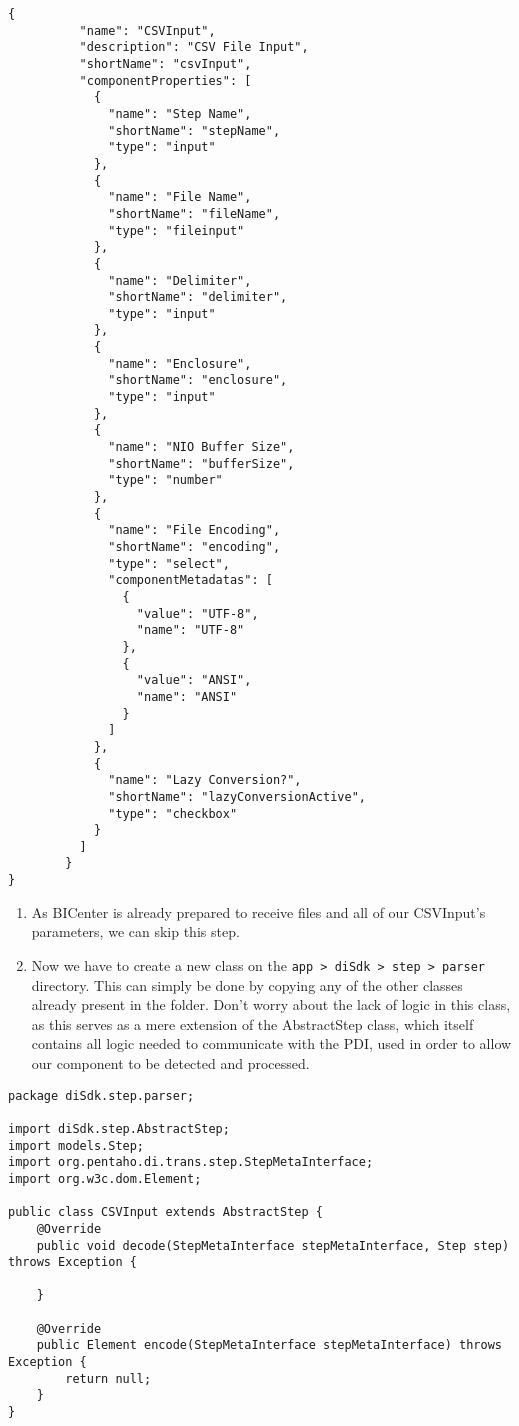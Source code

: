 \documentclass[
  11pt,
]{krantz}
\begin{document}
\begin{verbatim}
{
          "name": "CSVInput",
          "description": "CSV File Input",
          "shortName": "csvInput",
          "componentProperties": [
            {
              "name": "Step Name",
              "shortName": "stepName",
              "type": "input"
            },
            {
              "name": "File Name",
              "shortName": "fileName",
              "type": "fileinput"
            },
            {
              "name": "Delimiter",
              "shortName": "delimiter",
              "type": "input"
            },
            {
              "name": "Enclosure",
              "shortName": "enclosure",
              "type": "input"
            },
            {
              "name": "NIO Buffer Size",
              "shortName": "bufferSize",
              "type": "number"
            },
            {
              "name": "File Encoding",
              "shortName": "encoding",
              "type": "select",
              "componentMetadatas": [
                {
                  "value": "UTF-8",
                  "name": "UTF-8"
                },
                {
                  "value": "ANSI",
                  "name": "ANSI"
                }
              ]
            },
            {
              "name": "Lazy Conversion?",
              "shortName": "lazyConversionActive",
              "type": "checkbox"
            }
          ]
        }
}
\end{verbatim}

\begin{enumerate}
\def\labelenumi{\arabic{enumi}.}
\setcounter{enumi}{2}
\item
  As BICenter is already prepared to receive files and all of our CSVInput's parameters, we can skip this step.
\item
  Now we have to create a new class on the \texttt{app\ \textgreater{}\ diSdk\ \textgreater{}\ step\ \textgreater{}\ parser} directory. This can simply be done by copying any of the other classes already present in the folder. Don't worry about the lack of logic in this class, as this serves as a mere extension of the AbstractStep class, which itself contains all logic needed to communicate with the PDI, used in order to allow our component to be detected and processed.
\end{enumerate}

\begin{verbatim}
package diSdk.step.parser;

import diSdk.step.AbstractStep;
import models.Step;
import org.pentaho.di.trans.step.StepMetaInterface;
import org.w3c.dom.Element;

public class CSVInput extends AbstractStep {
    @Override
    public void decode(StepMetaInterface stepMetaInterface, Step step) throws Exception {

    }

    @Override
    public Element encode(StepMetaInterface stepMetaInterface) throws Exception {
        return null;
    }
}
\end{verbatim}
\end{document}

